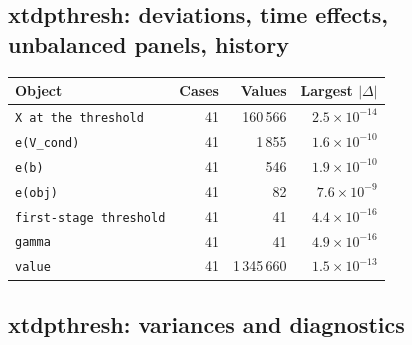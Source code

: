 \documentclass[10.5pt,a4paper]{article}
\begin{document}
\subsection*{xtdpthresh: deviations, time effects, unbalanced panels, history}

\begin{longtable}{@{}p{8.2cm}rrr@{}}
\toprule
Object & Cases & Values & Largest $|\Delta|$ \\
\midrule
\endhead
\texttt{X at the threshold} & 41 & 160\,566 & $2.5\times10^{-14}$ \\
\texttt{e(V\_\allowbreak{}cond)} & 41 & 1\,855 & $1.6\times10^{-10}$ \\
\texttt{e(b)} & 41 & 546 & $1.9\times10^{-10}$ \\
\texttt{e(obj)} & 41 & 82 & $7.6\times10^{-9}$ \\
\texttt{first-stage threshold} & 41 & 41 & $4.4\times10^{-16}$ \\
\texttt{gamma} & 41 & 41 & $4.9\times10^{-16}$ \\
\texttt{value} & 41 & 1\,345\,660 & $1.5\times10^{-13}$ \\
\bottomrule
\end{longtable}

\subsection*{xtdpthresh: variances and diagnostics}
\end{document}
